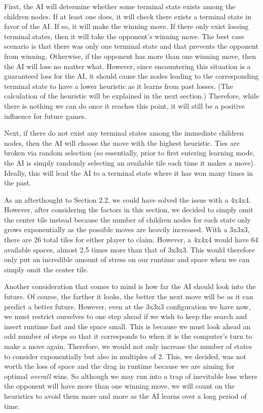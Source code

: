 \documentclass[preprint,12pt]{elsarticle}
\begin{document}
		First, the AI will determine whether some terminal state exists among the children nodes. If at least one does, it will check there exists a terminal state in favor of the AI. If so, it will make the winning move. If there only exist lossing terminal states, then it will take the opponent's winning move. The best case scenario is that there was only one terminal state and that prevents the opponent from winning. Otherwise, if the opponent has more than one winning move, then the AI will lose no matter what. However, since encountering this situation is a guaranteed loss for the AI, it should cause the nodes leading to the corresponding terminal state to have a lower heuristic as it learns from past losses. (The calculation of the heuristic will be explained in the next section.) Therefore, while there is nothing we can do once it reaches this point, it will still be a positive influence for future games.

		Next, if there do not exist any terminal states among the immediate children nodes, then the AI will choose the move with the highest heuristic. Ties are broken via random selection (so essentially, prior to first entering learning mode, the AI is simply randomly selecting an available tile each time it makes a move). Ideally, this will lead the AI to a terminal state where it has won many times in the past.

		As an afterthought to Section 2.2, we could have solved the issue with a 4x4x4. However, after considering the factors in this section, we decided to simply omit the center tile instead because the number of children nodes for each state only grows exponentially as the possible moves are heavily increased. With a 3x3x3, there are 26 total tiles for either player to claim. However, a 4x4x4 would have 64 available spaces, almost 2.5 times more than that of 3x3x3. This would therefore only put an incredible amount of stress on our runtime and space when we can simply omit the center tile.

		Another consideration that comes to mind is how far the AI should look into the future. Of course, the farther it looks, the better the next move will be as it can predict a better future. However, even at the 3x3x3 configuration we have now, we must restrict ourselves to one step ahead if we wish to keep the search and insert runtime fast and the space small. This is because we must look ahead an odd number of steps so that it corresponds to when it is the computer's turn to make a move again. Therefore, we would not only increase the number of states to consider exponentially but also in multiples of 2. This, we decided, was not worth the loss of space and the drag in runtime because we are aiming for optimal \textit{overall} wins. So although we may run into a trap of inevitable loss where the opponent will have more than one winning move, we will count on the heuristics to avoid them more and more as the AI learns over a long period of time.
\end{document}
